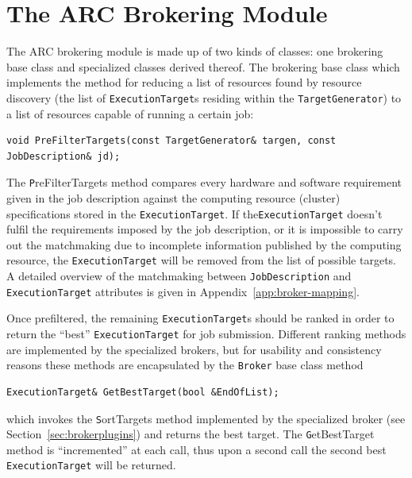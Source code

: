 \documentclass{book}
\newcommand{\Broker}{\texttt{Broker}}
\newcommand{\ExecutionTarget}{\texttt{ExecutionTarget}}
\newcommand{\JobDescription}{\texttt{JobDescription}}
\newcommand{\TargetGenerator}{\texttt{TargetGenerator}}
\begin{document}
\chapter{The ARC Brokering Module}
\label{sec:brokering}
The ARC brokering module is made up of two kinds of classes: one
brokering base class and specialized classes derived thereof. The
brokering base class which implements the method for reducing a list
of resources found by resource discovery (the list of
{\ExecutionTarget}s residing within the {\TargetGenerator}) to a list
of resources capable of running a certain job:

\begin{shaded}
\begin{verbatim}
void PreFilterTargets(const TargetGenerator& targen, const JobDescription& jd);
\end{verbatim}
\end{shaded}

The {\texttt PreFilterTargets} method compares every hardware and
software requirement given in the job description against the
computing resource (cluster) specifications stored in the
{\ExecutionTarget}. If the{\ExecutionTarget} doesn't fulfil the
requirements imposed by the job description, or it is impossible to
carry out the matchmaking due to incomplete information published by
the computing resource, the {\ExecutionTarget} will be removed from
the list of possible targets. A detailed overview of the matchmaking
between {\JobDescription} and {\ExecutionTarget} attributes is given
in Appendix~\ref{app:broker-mapping}.

Once prefiltered, the remaining {\ExecutionTarget}s should be ranked
in order to return the ``best'' {\ExecutionTarget} for job
submission. Different ranking methods are implemented by the
specialized brokers, but for usability and consistency reasons these
methods are encapsulated by the {\Broker} base class method

\begin{shaded}
\begin{verbatim}
ExecutionTarget& GetBestTarget(bool &EndOfList);
\end{verbatim}
\end{shaded}

which invokes the {\texttt SortTargets} method implemented by the
specialized broker (see Section~\ref{sec:brokerplugins}) and returns
the best target. The {\texttt GetBestTarget} method is ``incremented''
at each call, thus upon a second call the second best
{\ExecutionTarget} will be returned.
\end{document}
